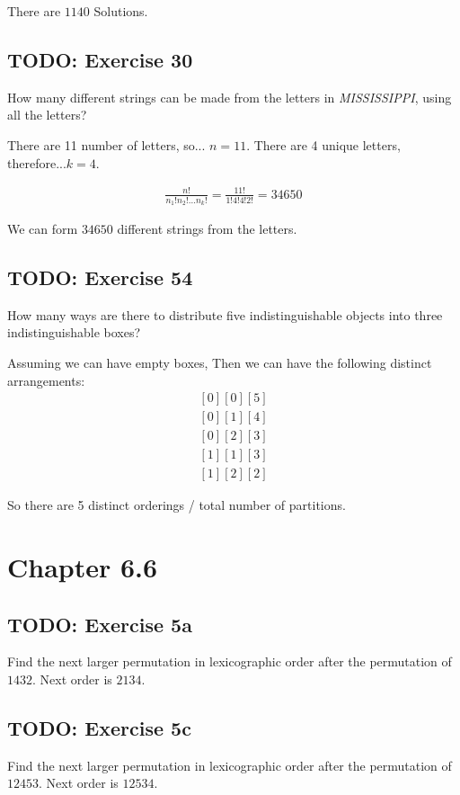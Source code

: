 \documentclass[12pt]{article}
\begin{document}
    There are $1140$ Solutions.

    \subsection{TODO: Exercise 30} 
    How many different strings can be made from the letters in \textit{MISSISSIPPI}, using all the letters?

    There are 11 number of letters, so... $n=11$. 
    There are 4 unique letters, therefore...$k=4$.

    \begin{equation}
        \begin{split}
            \frac{n!}{n_1!n_2!...n_k!}=\frac{11!}{1!4!4!2!}=34650
        \end{split}
    \end{equation}

    We can form $34650$ different strings from the letters.

    \subsection{TODO: Exercise 54}
    How many ways are there to distribute five indistinguishable objects into three indistinguishable boxes?

    Assuming we can have empty boxes, Then we can have the following distinct arrangements:
    \begin{equation}
        \begin{split}
            [0][0][5]\\
            [0][1][4]\\
            [0][2][3]\\
            [1][1][3]\\
            [1][2][2]
        \end{split}
    \end{equation}

    So there are 5 distinct orderings / total number of partitions.

    \section{Chapter 6.6} 
    \subsection{TODO: Exercise 5a}
    Find the next larger permutation in lexicographic order after the permutation of $1432$.
    Next order is $2134$.


    \subsection{TODO: Exercise 5c}
    Find the next larger permutation in lexicographic order after the permutation of $12453$.
    Next order is $12534$.
\end{document}
